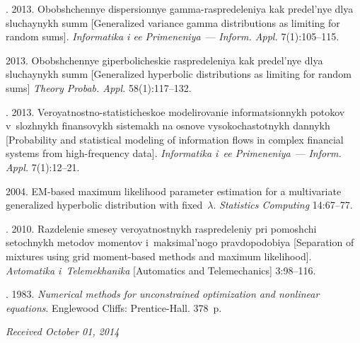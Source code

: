 \begin{multicols}{2}
{{\begin{thebibliography}{99}
. 2013.
{Obobshchennye dispersionnye gam\-ma-ras\-pre\-de\-le\-niya kak
predel'nye dlya sluchaynykh summ}
[Generalized variance gamma distributions as limiting for random sums].
\textit{Informatika i ee Primeneniya}~--- \textit{Inform. Appl.} 7(1):105--115.

  2013.
{Obobshchennye giperbolicheskie raspredeleniya kak predel'nye dlya sluchaynykh summ}
[Generalized hyperbolic distributions as limiting for random sums]
\textit{Theory Probab. Appl.} 58(1):117--132.

.
2013. {Ve\-ro\-yat\-no\-st\-no-sta\-ti\-sti\-che\-skoe
mo\-de\-li\-ro\-va\-nie informatsionnykh potokov v~slozhnykh finansovykh sistemakh
na osnove vysokochastotnykh dannykh}
[Probability and statistical modeling of information flows in complex
financial systems from high-frequency data].
\textit{Informatika i~ee Primeneniya}~--- \textit{Inform.  Appl.} 7(1):12--21.

 2004.
EM-based maximum likelihood parameter estimation for a multivariate
generalized hyperbolic distribution with fixed~$\lambda$.
\textit{Statistics Computing} 14:67--77.

. 2010.
{Razdelenie smesey veroyatnostnykh raspredeleniy pri pomoshchi
setochnykh metodov momentov i~maksimal'nogo pravdopodobiya}
[Separation of mixtures using grid moment-based methods and maximum likelihood].
\textit{Avtomatika i~Telemekhanika} [Automatics and Telemechanics] 3:98--116.

. 1983.
\textit{Numerical methods for unconstrained optimization and nonlinear equations}.
Englewood Cliffs: Prentice-Hall. 378~p.


\end{thebibliography}

 }
 }

\end{multicols}

\vspace*{-6pt}

\hfill{\small\textit{Received October 01, 2014}}

\vspace*{-18pt}

\Contr

